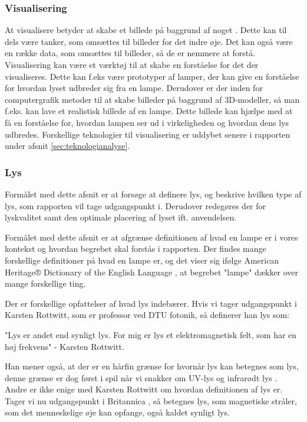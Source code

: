 \subsubsection{Visualisering}
At visualisere betyder at skabe et billede på baggrund af noget \cite{ddo_visualisering}. Dette kan til dels være tanker, som omsættes til billeder for det indre øje. Det kan også være en række data, som omsættes til billeder, så de er nemmere at forstå.
Visualisering kan være et værktøj til at skabe en forståelse for det der visualiseres. Dette kan f.eks være prototyper af lamper, der kan give en forståelse for hvordan lyset udbreder sig fra en lampe. Derudover er der inden for computergrafik metoder til at skabe billeder på baggrund af 3D-modeller, så man f.eks. kan lave et realistisk billede af en lampe. Dette billede kan hjælpe med at få en forståelse for, hvordan lampen ser ud i virkeligheden og hvordan dens lys udbredes. Forskellige teknologier til visualisering er uddybet senere i rapporten under afsnit \ref{sec:teknologianalyse}. 

\subsubsection{Lys}
Formålet med dette afsnit er at forsøge at definere lys, og beskrive hvilken type af lys, som rapporten vil tage udgangspunkt i. Derudover redegøres der for lyskvalitet samt den optimale placering af lyset ift. anvendelsen.


Formålet med dette afsnit er at afgrænse definitionen af hvad en lampe er i vores kontekst og hvordan begrebet skal forstås i rapporten.
Der findes mange forskellige definitioner på hvad en lampe er, og det viser sig ifølge American Heritage® Dictionary of the English Language \cite{american_heritage}, at begrebet "lampe" dækker over mange forskellige ting. 


Der er forskellige opfattelser af hvad lys indebærer. Hvis vi tager udgangspunkt i Karsten Rottwitt, som er professor ved DTU fotonik, så definerer han lys som:


"Lys er andet end synligt lys. For mig er lys et elektromagnetisk felt, som har en høj frekvens"
- Karsten Rottwitt\cite{def_lys}.

Han mener også, at der er en hårfin grænse for hvornår lys kan betegnes som lys, denne grænse er dog først i spil når vi snakker om UV-lys og infrarødt lys \cite{def_lys}. 
Andre er ikke enige med Karsten Rottwitt om hvordan definitionen af lys er. Tager vi nu udgangspunkt i Britannica \cite{britannica_lys}, så betegnes lys, som magnetiske stråler, som det menneskelige øje kan opfange, også kaldet synligt lys. 


